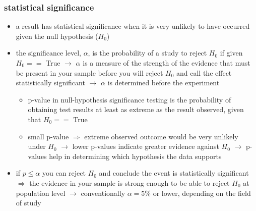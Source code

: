 \documentclass[12pt,a4paper]{article}
\begin{document}
\subsubsection{statistical significance} %
\label{ssub:statistical_significance}
\begin{itemize}
  \item a result has statistical significance when it is very unlikely to have occurred given the null hypothesis ($H_0$)
  \item the significance level, $\alpha$, is the probability of a study to reject $H_0$ if given $H_0 == $ True
  \newline \indent $\longrightarrow$ $\alpha$ is a measure of the strength of the evidence that must be present in your sample before you will reject $H_0$ and call the effect statistically significant
  \newline \indent $\longrightarrow$ $\alpha$ is determined before the experiment
  \begin{itemize}
    \item p-value in null-hypothesis significance testing is the probability of obtaining test results at least as extreme as the result observed, given that $H_0 ==$ True
    \item small p-value $\Longrightarrow$ extreme observed outcome would be very unlikely under $H_0$
    \newline \indent $\longrightarrow$ lower p-values indicate greater evidence against $H_0$
    \newline \indent $\longrightarrow$ p-values help in determining which hypothesis the data supports
  \end{itemize}
  \item if $p \le \alpha$ you can reject $H_0$ and conclude the event is statistically significant $\Longrightarrow$ the evidence in your sample is strong enough to be able to reject $H_0$ at population level
  \newline \indent $\longrightarrow$ conventionally $\alpha = 5\%$ or lower, depending on the field of study
\end{itemize}
\end{document}
